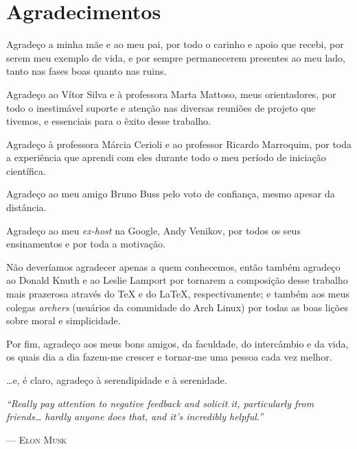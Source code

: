 
\dedication{Dedico esse trabalho aos meus pais, que sempre me apoiaram em tudo o que realizei.}

\chapter*{Agradecimentos}

Agradeço a minha mãe e ao meu pai, por todo o carinho e apoio que recebi, por serem meu exemplo de vida, e por sempre permanecerem presentes ao meu lado, tanto nas fases boas quanto nas ruins.

Agradeço ao Vítor Silva e à professora Marta Mattoso, meus orientadores, por todo o inestimável suporte e atenção nas diversas reuniões de projeto que tivemos, e essenciais para o êxito desse trabalho.

Agradeço à professora Márcia Cerioli e ao professor Ricardo Marroquim, por toda a experiência que aprendi com eles durante todo o meu período de iniciação científica.

Agradeço ao meu amigo Bruno Buss pelo voto de confiança, mesmo apesar da distância.

Agradeço ao meu \textit{ex-host} na Google, Andy Venikov, por todos os seus ensinamentos e por toda a motivação.

Não deveríamos agradecer apenas a quem conhecemos, então também agradeço ao Donald Knuth e ao Leslie Lamport por tornarem a composição desse trabalho mais prazerosa através do \TeX{} e do \LaTeX{}, respectivamente; e também aos meus colegas \textit{archers} (usuários da comunidade do Arch Linux) por todas as boas lições sobre moral e simplicidade.

Por fim, agradeço aos meus bons amigos, da faculdade, do intercâmbio e da vida, os quais dia a dia fazem-me crescer e tornar-me uma pessoa cada vez melhor.

\ldots{}e, é claro, agradeço à serendipidade e à serenidade.

\begin{center}
\end{center}

\vfill

\epigraph{\textit{``Really pay attention to negative feedback and solicit it, particularly from friends\ldots{} hardly anyone does that, and it's incredibly helpful.''}}{--- \textsc{Elon Musk}}
